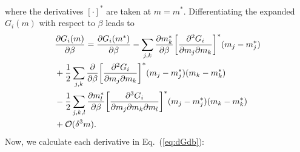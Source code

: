 \documentclass[prx,twocolumn,twoside,showpacs,superscriptaddress]{revtex4-1}
\begin{document}
where the derivatives $[\cdot]^*$ are taken at $m=m^*$.
Differentiating the expanded $G_i(m)$ with respect to $\beta$ leads to
\begin{align}
\label{eq:dGdb}
&\frac{\partial G_i(m)}{\partial \beta} = \frac{\partial G_i(m^*)}{\partial \beta} - \sum_{j,k} \frac{\partial m_k^* }{\partial \beta} \bigg[ \frac{\partial^2 G_i}{\partial m_j \partial m_k} \bigg]^* (m_j-m_j^*) \nonumber \\
&+ \frac{1}{2} \sum_{j,k} \frac{\partial }{\partial \beta} \bigg[ \frac{\partial^2 G_i}{\partial m_j \partial m_k} \bigg]^* (m_j-m_j^*)(m_k-m_k^*)\nonumber \\
&- \frac{1}{2} \sum_{j,k,l} \frac{\partial m_l^* }{\partial \beta} \bigg[ \frac{\partial^3 G_i}{\partial m_j \partial m_k \partial m_l} \bigg]^* (m_j-m_j^*)(m_k-m_k^*) \nonumber \\
&+{\cal O}(\delta^3 m) .
\end{align}
Now, we calculate each derivative in Eq.~(\ref{eq:dGdb}):
\end{document}
